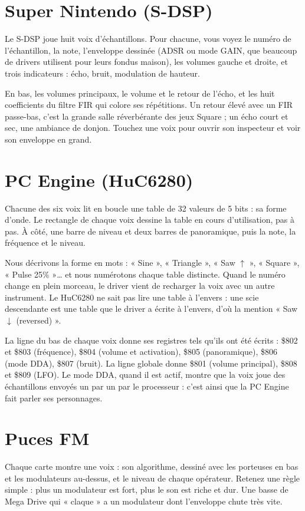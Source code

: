 \section{Super Nintendo (S-DSP)}
Le S-DSP joue huit voix d'échantillons. Pour chacune, vous voyez le numéro de l'échantillon, la note, l'enveloppe
dessinée (ADSR ou mode GAIN, que beaucoup de drivers utilisent pour leurs fondus maison), les volumes gauche et
droite, et trois indicateurs : écho, bruit, modulation de hauteur.

En bas, les volumes principaux, le volume et le retour de l'écho, et les huit coefficients du filtre FIR qui colore
ses répétitions. Un retour élevé avec un FIR passe-bas, c'est la grande salle réverbérante des jeux Square ; un écho
court et sec, une ambiance de donjon. Touchez une voix pour ouvrir son inspecteur et voir son enveloppe en grand.

\section{PC Engine (HuC6280)}
Chacune des six voix lit en boucle une table de 32 valeurs de 5 bits : sa forme d'onde. Le rectangle de chaque voix
dessine la table en cours d'utilisation, pas à pas. À côté, une barre de niveau et deux barres de panoramique, puis
la note, la fréquence et le niveau.

Nous décrivons la forme en mots : « Sine », « Triangle », « Saw $\uparrow$ », « Square », « Pulse 25\% »\dots{} et
nous numérotons chaque table distincte. Quand le numéro change en plein morceau, le driver vient de recharger la
voix avec un autre instrument. Le HuC6280 ne sait pas lire une table à l'envers : une scie descendante est une table
que le driver a écrite à l'envers, d'où la mention « Saw $\downarrow$ (reversed) ».

La ligne du bas de chaque voix donne ses registres tels qu'ils ont été écrits : \$802 et \$803 (fréquence),
\$804 (volume et activation), \$805 (panoramique), \$806 (mode DDA), \$807 (bruit). La ligne globale donne \$801
(volume principal), \$808 et \$809 (LFO). Le mode DDA, quand il est actif, montre que la voix joue des échantillons
envoyés un par un par le processeur : c'est ainsi que la PC Engine fait parler ses personnages.

\section{Puces FM}
Chaque carte montre une voix : son algorithme, dessiné avec les porteuses en bas et les modulateurs au-dessus, et le
niveau de chaque opérateur. Retenez une règle simple : plus un modulateur est fort, plus le son est riche et dur.
Une basse de Mega Drive qui « claque » a un modulateur dont l'enveloppe chute très vite.

